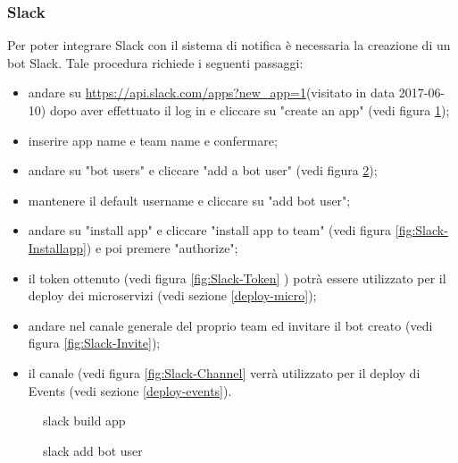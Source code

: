\subsubsection{Slack}\label{slack}
Per poter integrare Slack con il sistema di notifica è necessaria la creazione di un bot Slack. Tale procedura richiede i seguenti passaggi:
\begin{itemize}
\item andare su \url{https://api.slack.com/apps?new_app=1}(visitato in data 2017-06-10) dopo aver effettuato il log in e cliccare su "create an app" (vedi figura \ref{fig:Slack-Buildapp});
\item inserire app name e team name e confermare;
\item andare su "bot users" e cliccare "add a bot user" (vedi figura \ref{fig:Slack-Botuser});
\item mantenere il default username e cliccare su "add bot user";
\item andare su "install app" e cliccare "install app to team" (vedi figura \ref{fig:Slack-Installapp}) e poi premere "authorize";
\item il token ottenuto (vedi figura \ref{fig:Slack-Token} ) potrà essere utilizzato per il deploy dei microservizi (vedi sezione \ref{deploy-micro});
\item andare nel canale generale del proprio team ed invitare il bot creato (vedi figura \ref{fig:Slack-Invite});
\item il canale (vedi figura \ref{fig:Slack-Channel} verrà utilizzato per il deploy di Events (vedi sezione \ref{deploy-events}).
\end{itemize}
\begin{figure}[H]
	\caption{slack build app}\label{fig:Slack-Buildapp}
\end{figure}
\begin{figure}[H]
	\caption{slack add bot user}\label{fig:Slack-Botuser}
\end{figure}
